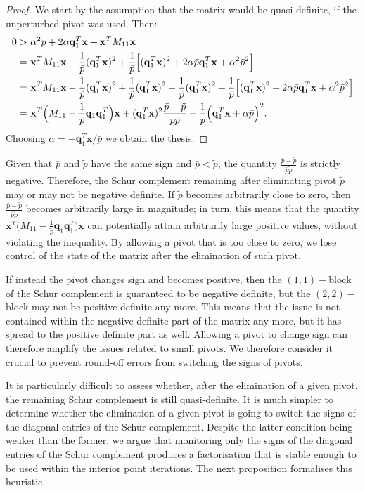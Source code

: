\documentclass[a4paper]{article}
\newcommand{\qvec}{\mathbf q}
\newcommand{\xvec}{\mathbf x}
\newcommand{\0}{\mathbf 0}
\begin{document}
\begin{proof}
We start by the assumption that the matrix would be quasi-definite, if the unperturbed pivot was used. Then:
\begin{align}
0>\,\,& \alpha^2\bar p+2\alpha \qvec_1^T\xvec +\xvec^TM_{11}\xvec \notag\\
=\,\,& \xvec^TM_{11}\xvec-\frac{1}{\bar p}(\qvec_1^T\xvec)^2+\frac{1}{\bar p}\Big[(\qvec_1^T\xvec)^2+2\alpha \bar p \qvec_1^T\xvec+\alpha^2 \bar p^2\Big] \notag\\
=\,\,& \xvec^TM_{11}\xvec
-\frac{1}{\tilde p}(\qvec_1^T\xvec)^2
+\frac{1}{\tilde p}(\qvec_1^T\xvec)^2
-\frac{1}{\bar p}(\qvec_1^T\xvec)^2
+\frac{1}{\bar p}\Big[(\qvec_1^T\xvec)^2+2\alpha \bar p \qvec_1^T\xvec+\alpha^2 \bar p^2\Big] \notag\\
=\,\,& \xvec^T\Big(M_{11}-\frac{1}{\tilde p}\qvec_1\qvec_1^T\Big)\xvec
+(\qvec_1^T\xvec)^2\frac{\bar p-\tilde p}{\bar p\tilde p}
+\frac{1}{\bar p}\Big(\qvec_1^T\xvec+\alpha \bar p\Big)^2 \notag.
\end{align}
Choosing $\alpha=-\qvec_1^T\xvec/\bar p$ we obtain the thesis.
\end{proof}
Given that $\bar p$ and $\tilde p$ have the same sign and $\bar p<\tilde p$, the quantity $\frac{\bar p-\tilde p}{\bar p\tilde p}$ is strictly negative. Therefore, the Schur complement remaining after eliminating pivot $\tilde p$ may or may not be negative definite. If $\tilde p$ becomes arbitrarily close to zero, then $\frac{\bar p-\tilde p}{\bar p\tilde p}$ becomes arbitrarily large in magnitude; in turn, this means that the quantity $\xvec^T\big(M_{11}-\frac{1}{\tilde p}\qvec_1\qvec_1^T\big)\xvec$ can potentially attain arbitrarily large positive values, without violating the inequality. By allowing a pivot that is too close to zero, we lose control of the state of the matrix after the elimination of such pivot. 

If instead the pivot changes sign and becomes positive, then the $(1,1)-$block of the Schur complement is guaranteed to be negative definite, but the $(2,2)-$block may not be positive definite any more. This means that the issue is not contained within the negative definite part of the matrix any more, but it has spread to the positive definite part as well. Allowing a pivot to change sign can therefore amplify the issues related to small pivots. We therefore consider it crucial to prevent round-off errors from switching the signs of pivots. 

It is particularly difficult to assess whether, after the elimination of a given pivot, the remaining Schur complement is still quasi-definite. It is much simpler to determine whether the elimination of a given pivot is going to switch the signs of the diagonal entries of the Schur complement.
Despite the latter condition being weaker than the former, we argue that monitoring only the signs of the diagonal entries of the Schur complement produces a factorisation that is stable enough to be used within the interior point iterations. The next proposition formalises this heuristic.
\end{document}
